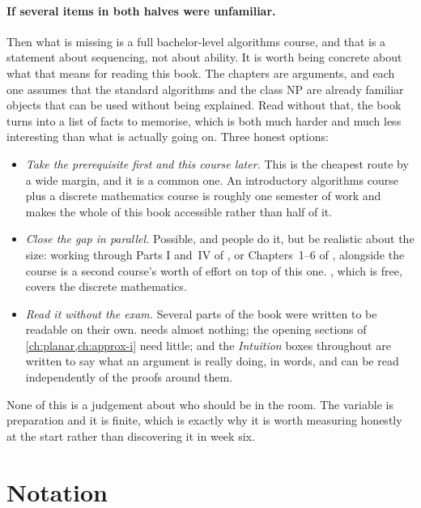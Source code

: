 \paragraph{If several items in both halves were unfamiliar.}
Then what is missing is a full bachelor-level algorithms course, and that is a
statement about sequencing, not about ability. It is worth being concrete about
what that means for reading this book. The chapters are arguments, and each one
assumes that the standard algorithms and the class \textrm{NP} are already
familiar objects that can be used without being explained. Read without that,
the book turns into a list of facts to memorise, which is both much harder and
much less interesting than what is actually going on. Three honest options:

\begin{itemize}[leftmargin=*]
  \item \emph{Take the prerequisite first and this course later.} This is the
        cheapest route by a wide margin, and it is a common one. An
        introductory algorithms course plus a discrete mathematics course is
        roughly one semester of work and makes the whole of this book
        accessible rather than half of it.
  \item \emph{Close the gap in parallel.} Possible, and people do it, but be
        realistic about the size: working through Parts I and~IV of
        \citet{CLRS2022}, or Chapters~1--6 of \citet{KleinbergTardos2005},
        alongside the course is a second course's worth of effort on top of
        this one. \citet{LehmanLeightonMeyer2018}, which is free, covers the
        discrete mathematics.
  \item \emph{Read it without the exam.} Several parts of the book were written
        to be readable on their own.  needs almost
        nothing; the opening sections of \cref{ch:planar,ch:approx-i} need
        little; and the \emph{Intuition} boxes throughout are written to say
        what an argument is really doing, in words, and can be read
        independently of the proofs around them.
\end{itemize}

None of this is a judgement about who should be in the room. The variable is
preparation and it is finite, which is exactly why it is worth measuring
honestly at the start rather than discovering it in week six.

\section{Notation}
\label{sec:prelim-notation}

